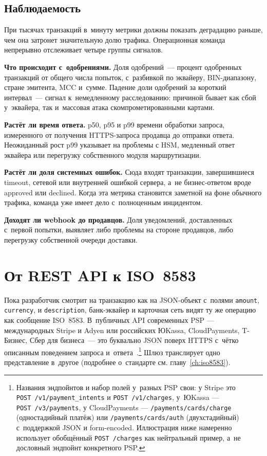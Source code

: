 \subsection*{Наблюдаемость}

При тысячах транзакций в~минуту метрики должны показать деградацию
раньше, чем она затронет значительную долю трафика.
Операционная команда непрерывно отслеживает четыре группы сигналов.

\textbf{Что происходит с~одобрениями.} Доля одобрений~---
процент одобренных транзакций
от общего числа попыток, с~разбивкой по эквайеру, BIN-диапазону,
стране эмитента, MCC и~сумме. Падение доли одобрений
за короткий интервал~--- сигнал к~немедленному расследованию:
причиной бывает как сбой у~эквайера, так и~массовая атака
скомпрометированными картами.

\textbf{Растёт ли время ответа.} p50, p95 и p99 времени обработки
запроса, измеренного от получения HTTPS-запроса продавца
до отправки ответа. Неожиданный рост p99 указывает
на проблемы с HSM, медленный ответ эквайера или перегрузку
собственного модуля маршрутизации.

\textbf{Растёт ли доля системных ошибок.} Сюда входят транзакции,
завершившиеся timeout, сетевой или внутренней ошибкой сервера,
а~не бизнес-ответом вроде approved или declined. Когда эта
метрика становится заметной на фоне обычного трафика, команда
уже имеет дело с~полноценным инцидентом.

\textbf{Доходят ли webhook до продавцов.} Доля уведомлений,
доставленных с~первой попытки, выявляет либо проблемы
на стороне продавцов, либо перегрузку собственной очереди
доставки.

\section{От REST API к ISO~8583}\label{sec:gw-api-to-iso}

Пока разработчик смотрит на транзакцию как на JSON-объект
с~полями \texttt{amount}, \texttt{currency},
 и \texttt{description}, банк-эквайер
и карточная сеть видят ту же операцию как сообщение
ISO~8583. В~публичных API современных PSP --- международных
Stripe и Adyen или российских ЮKassa, CloudPayments, T-Бизнес,
Сбер для бизнеса~--- это буквально JSON поверх HTTPS с~чётко
описанным поведением запроса и~ответа~\cite{stripe-api-reference,yookassa-api,cloudpayments-api}.\footnote{Названия
эндпойнтов и набор полей у~разных PSP свои: у Stripe это
\texttt{POST~/v1/payment\_intents} и \texttt{POST~/v1/charges},
у~ЮKassa --- \texttt{POST~/v3/payments}, у CloudPayments ---
\texttt{/payments/cards/charge} (одностадийный платёж) или
\texttt{/payments/cards/auth} (двухстадийный) с~поддержкой
JSON и form-encoded.
Иллюстрация ниже намеренно использует обобщённый
\texttt{POST~/charges} как нейтральный пример, а~не дословный
эндпойнт конкретного PSP.} Шлюз транслирует одно
представление в~другое (подробнее о~стандарте см.
главу~\ref{ch:iso8583}).

